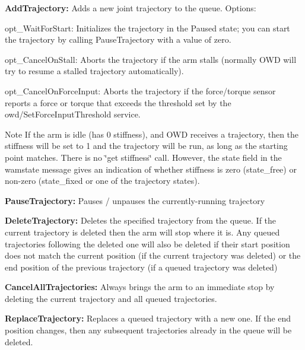 \begin{DoxyItemize}
\item {\bfseries Add\-Trajectory\-:} Adds a new joint trajectory to the queue. Options\-:
\begin{DoxyItemize}
\item opt\-\_\-\-Wait\-For\-Start\-: Initializes the trajectory in the Paused state; you can start the trajectory by calling Pause\-Trajectory with a value of zero.
\item opt\-\_\-\-Cancel\-On\-Stall\-: Aborts the trajectory if the arm stalls (normally O\-W\-D will try to resume a stalled trajectory automatically).
\item opt\-\_\-\-Cancel\-On\-Force\-Input\-: Aborts the trajectory if the force/torque sensor reports a force or torque that exceeds the threshold set by the owd/\-Set\-Force\-Input\-Threshold service. \begin{DoxyNote}{Note}
If the arm is idle (has 0 stiffness), and O\-W\-D receives a trajectory, then the stiffness will be set to 1 and the trajectory will be run, as long as the starting point matches. There is no \char`\"{}get stiffness\char`\"{} call. However, the state field in the wamstate message gives an indication of whether stiffness is zero (state\-\_\-free) or non-\/zero (state\-\_\-fixed or one of the trajectory states).
\end{DoxyNote}

\end{DoxyItemize}
\item {\bfseries Pause\-Trajectory\-:} Pauses / unpauses the currently-\/running trajectory
\item {\bfseries Delete\-Trajectory\-:} Deletes the specified trajectory from the queue. If the current trajectory is deleted then the arm will stop where it is. Any queued trajectories following the deleted one will also be deleted if their start position does not match the current position (if the current trajectory was deleted) or the end position of the previous trajectory (if a queued trajectory was deleted)
\item {\bfseries Cancel\-All\-Trajectories\-:} Always brings the arm to an immediate stop by deleting the current trajectory and all queued trajectories.
\item {\bfseries Replace\-Trajectory\-:} Replaces a queued trajectory with a new one. If the end position changes, then any subsequent trajectories already in the queue will be deleted.
\end{DoxyItemize}

